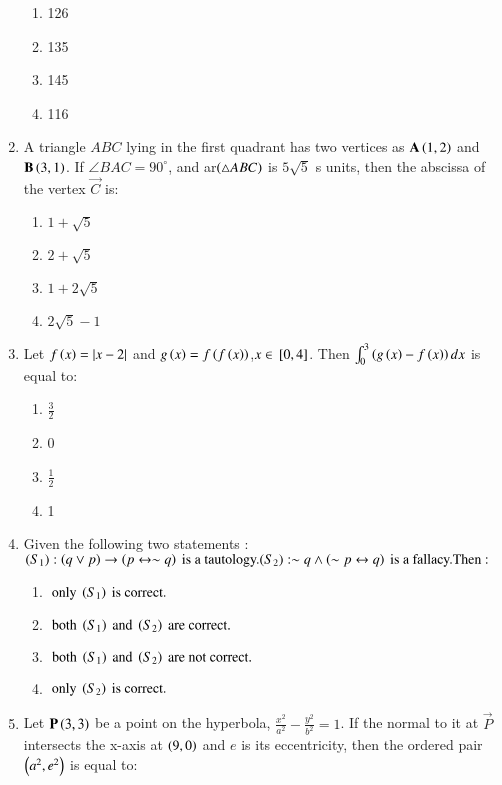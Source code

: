 \documentclass[journal]{IEEEtran}
\begin{document}
\begin{enumerate}
\begin{enumerate}
    \item 126
    \item 135
    \item 145
    \item 116
\end{enumerate}
\item A triangle $ABC$ lying in the first quadrant has two vertices as $ \mathbf{A}\left(1,2\right)$ and $\mathbf{B}\left(3,1\right)$. If $\angle BAC=90^\circ$, and ar$\left(\triangle ABC\right)$ is $5\sqrt{5}$ s units, then the abscissa of the vertex $\vec{C}$ is:
\begin{enumerate}
    \item $1+\sqrt{5}$
    \item $2+\sqrt{5}$
    \item $1+2\sqrt{5}$
    \item $2\sqrt{5}-1$
\end{enumerate}
\item Let $f\left(x\right)=\left\vert x-2\right\vert$ and $g\left(x\right)=f\left(f\left(x\right)\right)$,$x\in {}\left[0, 4\right]$. Then $\int_0^3 \left(g\left(x\right)-f\left(x\right)\right) dx$ is equal to:
\begin{enumerate}
    \item $\frac{3}{2}$
    \item 0
    \item $\frac{1}{2}$
    \item 1
\end{enumerate}
\item Given the following two statements : \\
$(S_{1}) : \left(q \vee p\right) \rightarrow \left(p \leftrightarrow \sim q\right) \text{ is a tautology.} \\
(S_{2}) : \sim q \wedge \left(\sim p \leftrightarrow q\right) \text{ is a fallacy.} \\
\text{Then :}$ \\
\begin{enumerate}
\item $\text{ only } \left(S_{1}\right) \text{ is correct.}$
\item $\text{ both } \left(S_{1}\right) \text{ and } \left(S_{2}\right) \text{ are correct.}$
\item $\text{ both } \left(S_{1}\right) \text{ and } \left(S_{2}\right) \text{ are not correct.}$
\item $\text{ only } \left(S_{2}\right) \text{ is correct.}$
\end{enumerate}
\item Let $\mathbf{P}\left(3,3\right)$ be a point on the hyperbola, $\frac{x^2}{a^2}-\frac{y^2}{b^2}=1$. If the normal to it at $\vec{P}$ intersects the x-axis at $\left(9,0\right)$ and $e$ is its eccentricity, then the ordered pair $\left(a^2, e^2\right)$ is equal to:

\end{enumerate}
\end{document}
